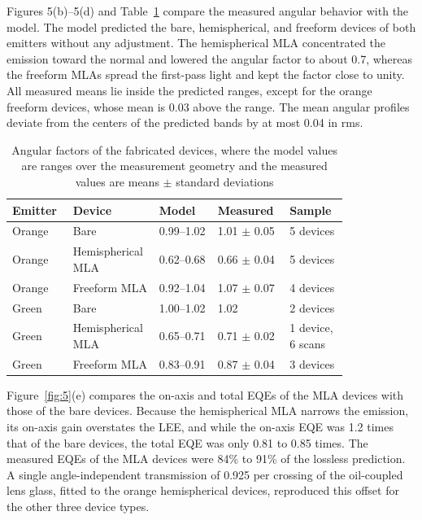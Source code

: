 \documentclass{optica-article}
\begin{document}
Figures 5(b)–5(d) and Table~\ref{tab:2} compare the measured angular behavior with the model. The model predicted the bare, hemispherical, and freeform devices of both emitters without any adjustment. The hemispherical MLA concentrated the emission toward the normal and lowered the angular factor to about 0.7, whereas the freeform MLAs spread the first-pass light and kept the factor close to unity. All measured means lie inside the predicted ranges, except for the orange freeform devices, whose mean is 0.03 above the range. The mean angular profiles deviate from the centers of the predicted bands by at most 0.04 in rms.

\begin{table}[htbp]
\centering
\footnotesize
\caption{Angular factors of the fabricated devices, where the model values are ranges over the measurement geometry and the measured values are means \ensuremath{\pm} standard deviations}
\label{tab:2}
\begin{tabular}{p{0.164\linewidth}p{0.164\linewidth}p{0.164\linewidth}p{0.164\linewidth}p{0.164\linewidth}}
\hline
Emitter & Device & Model & Measured & Sample \\
\hline
Orange & Bare & 0.99–1.02 & 1.01 \ensuremath{\pm} 0.05 & 5 devices \\
Orange & Hemispherical MLA & 0.62–0.68 & 0.66 \ensuremath{\pm} 0.04 & 5 devices \\
Orange & Freeform MLA & 0.92–1.04 & 1.07 \ensuremath{\pm} 0.07 & 4 devices \\
Green & Bare & 1.00–1.02 & 1.02 & 2 devices \\
Green & Hemispherical MLA & 0.65–0.71 & 0.71 \ensuremath{\pm} 0.02 & 1 device, 6 scans \\
Green & Freeform MLA & 0.83–0.91 & 0.87 \ensuremath{\pm} 0.04 & 3 devices \\
\hline
\end{tabular}
\end{table}

Figure~\ref{fig:5}(e) compares the on-axis and total EQEs of the MLA devices with those of the bare devices. Because the hemispherical MLA narrows the emission, its on-axis gain overstates the LEE, and while the on-axis EQE was 1.2 times that of the bare devices, the total EQE was only 0.81 to 0.85 times. The measured EQEs of the MLA devices were 84\% to 91\% of the lossless prediction. A single angle-independent transmission of 0.925 per crossing of the oil-coupled lens glass, fitted to the orange hemispherical devices, reproduced this offset for the other three device types.
\end{document}
